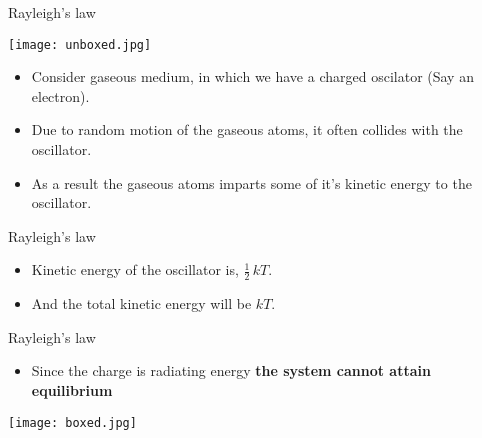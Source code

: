 \documentclass[aspectratio=169]{beamer}
\begin{document}
\begin{frame}{Rayleigh's law}

	\begin{multicols}{2}
	
	
		\texttt{[image: unboxed.jpg]} \pause
	 
 
		\columnbreak
		
		\begin{itemize}
		
			\item Consider gaseous medium, in which we have a charged oscilator (Say an electron). \pause \newline
			\item Due to random motion of the gaseous atoms, it often collides with the oscillator. \pause \newline
			\item As a result the gaseous atoms imparts some of it's kinetic energy to the oscillator.
		
		\end{itemize}

	
	\end{multicols}
		

\end{frame}

\begin{frame}{Rayleigh's law}
	
		\begin{itemize}
			
		\item {\large Kinetic energy of the oscillator is, $\frac{1}{2}\,kT$.} \newline
		 
		\item {\large And the total kinetic energy will be  $ kT $. }
		 
		\end{itemize}
		
\end{frame}
	
\begin{frame}{Rayleigh's law}

	 	
		\begin{multicols}{2}
  			\begin{itemize}
  				\item {\large Since the charge is radiating energy \textbf{the system cannot attain equilibrium}} \pause
  			\end{itemize}
  				
	\columnbreak
	
			\texttt{[image: boxed.jpg]}
			
		\end{multicols}
		

	
\end{frame}
	
\end{document}
